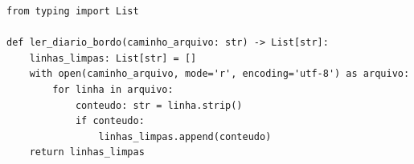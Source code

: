 \ifmostrarGabarito
\begin{verbatim}
from typing import List

def ler_diario_bordo(caminho_arquivo: str) -> List[str]:
    linhas_limpas: List[str] = []
    with open(caminho_arquivo, mode='r', encoding='utf-8') as arquivo:
        for linha in arquivo:
            conteudo: str = linha.strip()
            if conteudo:
                linhas_limpas.append(conteudo)
    return linhas_limpas
\end{verbatim}
\fi
